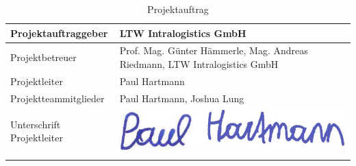 \begin{longtable}{p{}|p{}}
  Projektauftraggeber        & LTW Intralogistics GmbH                                                                        \\ \midrule

  Projektbetreuer            & Prof. Mag. Günter Hämmerle, Mag. Andreas Riedmann, LTW Intralogistics GmbH                     \\ \midrule

  Projektleiter              & Paul Hartmann                                                                                  \\ \midrule

  Projektteammitglieder      & Paul Hartmann, Joshua Lung                                                                     \\ \midrule

  Unterschrift Projektleiter &
  \multicolumn{1}{c}{
  \begin{minipage}[c][13ex]{0.25\textwidth}
      \includegraphics[width=1\textwidth]{images/Unterschrift_Paul.png}
    \end{minipage}}                                                            \\
  \bottomrule
  \caption{Projektauftrag}
  \label{tab:projektauftrag}
\end{longtable}
